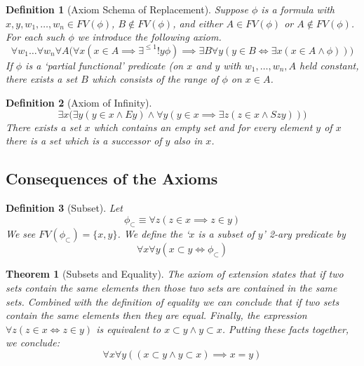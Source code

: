 \documentclass[12pt]{article}
\theoremstyle{break}
\newtheorem{definition}{Definition}[section]
\theoremstyle{break}
\newtheorem{theorem}{Theorem}[section]
\theoremstyle{break}
\theoremstyle{break}
\theoremstyle{break}
\newtheorem{informal definition}[definition]{Informal Definition}
\begin{document}
\begin{definition}[Axiom Schema of Replacement]
Suppose $\phi$ is a formula with $x, y, w_1, \ldots, w_n \in FV(\phi)$, $B\not \in FV(\phi)$, and either $A\in FV(\phi)$ or $A\not \in FV(\phi)$.
For each such $\phi$ we introduce the following axiom.
$$
\forall w_1 \ldots \forall w_n\forall A\Big(\forall x (x\in A \implies \exists^{\le1}! y\phi)  \implies \exists B \forall y(y\in B \iff \exists x(x\in A \land \phi))\Big)
$$
If $\phi$ is a `partial functional' predicate (on $x$ and $y$ with $w_1,\ldots, w_n, A$ held constant, there exists a set $B$ which consists of the range of $\phi$ on $x\in A$.
\end{definition}

\begin{definition}[Axiom of Infinity]
$$
\exists x \Big(\exists y (y\in x \land Ey) \land \forall y(y\in x \implies \exists z (z\in x \land Szy))\Big)
$$
There exists a set $x$ which contains an empty set and for every element $y$ of $x$ there is a set which is a successor of $y$ also in $x$.
\end{definition}

\subsection{Consequences of the Axioms}

\begin{definition}[Subset]
Let
$$
\phi_{\subset} \equiv \forall z (z\in x \implies z \in y)
$$
We see $FV(\phi_{\subset}) = \{x, y\}$.
We define the `$x$ is a subset of $y$' 2-ary predicate by
$$
\forall x \forall y (x\subset y \iff \phi_{\subset})
$$
\end{definition}

\begin{theorem}[Subsets and Equality]
The axiom of extension states that if two sets contain the same elements then those two sets are contained in the same sets.
Combined with the definition of equality we can conclude that if two sets contain the same elements then they are equal.
Finally, the expression $\forall z(z\in x \iff z \in y)$ is equivalent to $x \subset y \land y \subset x$.
Putting these facts together, we conclude:
$$
\forall x \forall y ((x\subset y \land y \subset x)\implies x=y)
$$
\end{theorem}
\end{document}

